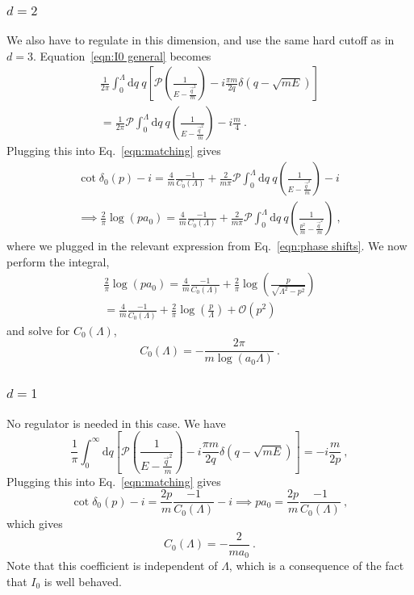 \documentclass[11pt]{article}
\begin{document}
\subsubsection{$d=2$}
We also have to regulate in this dimension, and use the same hard cutoff as in $d=3$.  Equation~\eqref{eqn:I0 general} becomes
\begin{multline}
\frac{1}{2\pi}\int_0^\Lambda  \mathrm { d } q \ q\left[\mathcal{P} \left( \frac { 1 } { E - \frac{\vec{q}^2}{m} } \right)
-i\frac{\pi m}{2q}\delta(q-\sqrt{mE})\right]\\
=\frac{1}{2\pi}\mathcal{P}\int_0^\Lambda  \mathrm { d } q \ q \left( \frac { 1 } { E - \frac{\vec{q}^2}{m} } \right)
-i\frac{m}{4}\ .
\end{multline}
Plugging this into Eq.~\eqref{eqn:matching} gives
\begin{multline}
\cot \delta_0(p)-i=\frac{4}{m}\frac{-1}{C_0(\Lambda)}+\frac{2}{m\pi}\mathcal{P}\int_0^\Lambda  \mathrm { d } q \ q \left( \frac { 1 } { E - \frac{\vec{q}^2}{m} } \right)
-i\\
\implies \frac { 2 } { \pi } \log \left( p a _ { 0 } \right)=\frac{4}{m}\frac{-1}{C_0(\Lambda)}+\frac{2}{m\pi}\mathcal{P}\int_0^\Lambda  \mathrm { d } q \ q \left( \frac { 1 } { \frac{p^2}{m} - \frac{\vec{q}^2}{m} } \right)\ ,
\end{multline}
where we plugged in the relevant expression from Eq.~\eqref{eqn:phase shifts}.
We now perform the integral,
\begin{multline}
\frac { 2 } { \pi } \log \left( p a _ { 0 } \right)=\frac{4}{m}\frac{-1}{C_0(\Lambda)}+\frac{2}{\pi } \log \left(\frac{p}{\sqrt{\Lambda ^2-p^2}}\right)\\
=\frac{4}{m}\frac{-1}{C_0(\Lambda)}+\frac{2}{\pi } \log \left(\frac{p}{\Lambda}\right)+\mathcal{O}(p^2)
\end{multline}
and solve for $C_0(\Lambda)$,
\begin{equation}\label{eqn:C 2}
C_0(\Lambda)%
=-\frac{2 \pi }{m \log (a_0\Lambda)}\ .
\end{equation}
   
\subsubsection{$d=1$}
No regulator is needed in this case.  We have
\begin{equation}
\frac{1}{\pi}\int_{0}^{\infty}  \mathrm { d } q \left[\mathcal{P} \left( \frac { 1 } { E - \frac{\vec{q}^2}{m} } \right)
-i\frac{\pi m}{2q}\delta(q-\sqrt{mE})\right]
=-i\frac{m}{2p}\ ,
\end{equation}
Plugging this into Eq.~\eqref{eqn:matching} gives
\begin{equation}
\cot \delta_0(p)-i=\frac{2p}{m}\frac{-1}{C_0(\Lambda)}-i
\implies p a_0=\frac{2p}{m}\frac{-1}{C_0(\Lambda)}\ ,
\end{equation}
which gives
\begin{equation}\label{eqn:C 1}
C_0(\Lambda)=-\frac{2}{ma_0}\ .
\end{equation}
Note that this coefficient is independent of $\Lambda$, which is a consequence of the fact that $I_0$ is well behaved.
\end{document}
